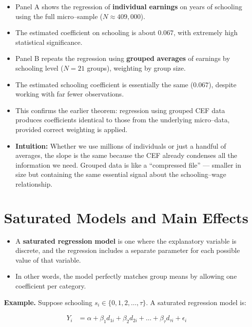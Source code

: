 \documentclass[12pt]{article}
\begin{document}
\begin{itemize}
    \item Panel A shows the regression of \textbf{individual earnings} on years of schooling using the full micro–sample ($N \approx 409{,}000$).  
    \item The estimated coefficient on schooling is about $0.067$, with extremely high statistical significance.  
    \item Panel B repeats the regression using \textbf{grouped averages} of earnings by schooling level ($N=21$ groups), weighting by group size.  
    \item The estimated schooling coefficient is essentially the same ($0.067$), despite working with far fewer observations.  
    \item This confirms the earlier theorem: regression using grouped CEF data produces coefficients identical to those from the underlying micro–data, provided correct weighting is applied.
    \item \textbf{Intuition:} Whether we use millions of individuals or just a handful of averages, the slope is the same because the CEF already condenses all the information we need. Grouped data is like a “compressed file” — smaller in size but containing the same essential signal about the schooling–wage relationship.
\end{itemize}

\section*{\noindent\textbf{Saturated Models and Main Effects}}

\begin{itemize}
    \item A \textbf{saturated regression model} is one where the explanatory variable is discrete, and the regression includes a separate parameter for each possible value of that variable.  
    \item In other words, the model perfectly matches group means by allowing one coefficient per category.  
\end{itemize}

\noindent \textbf{Example.} Suppose schooling $s_i \in \{0,1,2,\dots,\tau\}$. A saturated regression model is:

\singlespacing
\begin{align}
Y_i &= \alpha + \beta_1 d_{1i} + \beta_2 d_{2i} + \dots + \beta_\tau d_{\tau i} + \epsilon_i 
\end{align}
\end{document}
